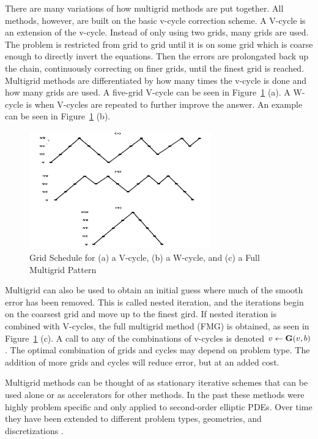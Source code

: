 There are many variations of how multigrid methods are put together. All methods, however, are built on the basic v-cycle correction scheme. A V-cycle is an extension of the v-cycle. Instead of only using two grids, many grids are used. The problem is restricted from grid to grid until it is on some grid which is coarse enough to directly invert the equations. Then the errors are prolongated back up the chain, continuously correcting on finer grids, until the finest grid is reached. Multigrid methods are differentiated by how many times the v-cycle is done and how many grids are used. A five-grid V-cycle can be seen in Figure~\ref{fig:Vcycle} (a). A W-cycle is when V-cycles are repeated to further improve the answer. An example can be seen in Figure~\ref{fig:Vcycle} (b). 
\begin{figure}
    \begin{center}
      \includegraphics [width=0.7\textwidth, height=0.7\textheight, angle=180 ] {multigridFig}
   \end{center}
   \caption{Grid Schedule for (a) a V-cycle, (b) a W-cycle, and (c) a Full Multigrid Pattern \cite{Briggs2000}}
   \label{fig:Vcycle}
\end{figure}

Multigrid can also be used to obtain an initial guess where much of the smooth error has been removed. This is called nested iteration, and the iterations begin on the coarsest grid and move up to the finest gird. If nested iteration is combined with V-cycles, the full multigrid method (FMG) is obtained, as seen in Figure~\ref{fig:Vcycle} (c). A call to any of the combinations of v-cycles is denoted $v \leftarrow \mathbf{G}(v, b)$. The optimal combination of grids and cycles may depend on problem type. The addition of more grids and cycles will reduce error, but at an added cost. 

Multigrid methods can be thought of as stationary iterative schemes that can be used alone or as accelerators for other methods. In the past these methods were highly problem specific and only applied to second-order elliptic PDEs. Over time they have been extended to different problem types, geometries, and discretizations \cite{Benzi2002}. 

